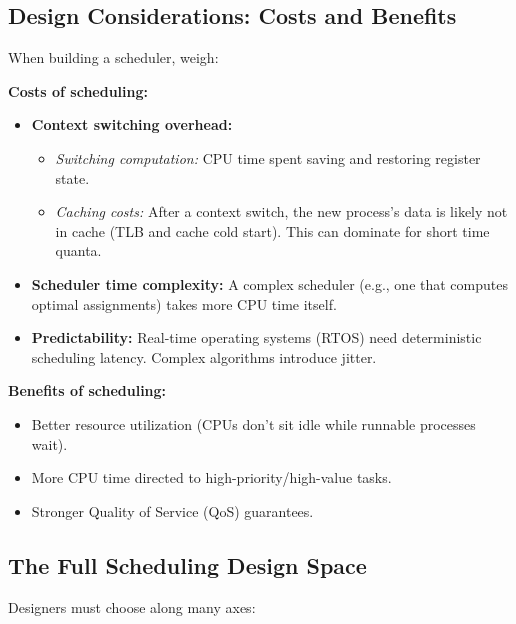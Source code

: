 \documentclass[11pt]{article}
\begin{document}
\subsection{Design Considerations: Costs and Benefits}

When building a scheduler, weigh:

\textbf{Costs of scheduling:}
\begin{itemize}
    \item \textbf{Context switching overhead:}
    \begin{itemize}
        \item \emph{Switching computation:} CPU time spent saving and restoring register state.
        \item \emph{Caching costs:} After a context switch, the new process's data is likely not in cache (TLB and cache cold start). This can dominate for short time quanta.
    \end{itemize}
    \item \textbf{Scheduler time complexity:} A complex scheduler (e.g., one that computes optimal assignments) takes more CPU time itself.
    \item \textbf{Predictability:} Real-time operating systems (RTOS) need deterministic scheduling latency. Complex algorithms introduce jitter.
\end{itemize}

\textbf{Benefits of scheduling:}
\begin{itemize}
    \item Better resource utilization (CPUs don't sit idle while runnable processes wait).
    \item More CPU time directed to high-priority/high-value tasks.
    \item Stronger Quality of Service (QoS) guarantees.
\end{itemize}

\subsection{The Full Scheduling Design Space}

Designers must choose along many axes:
\end{document}
